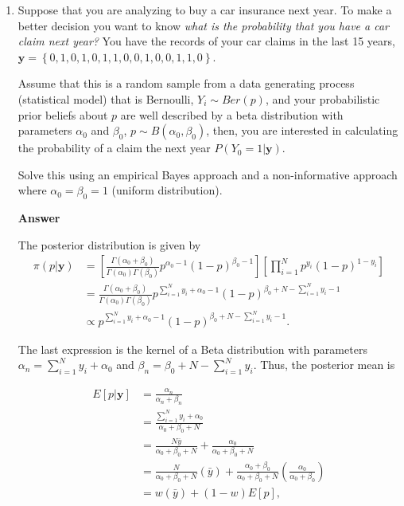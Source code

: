 \begin{enumerate}[leftmargin=*]
\item Suppose that you are analyzing to buy a car insurance next year. To make a better decision you want to know \textit{what is the probability that you have a car claim next year?} You have the records of your car claims in the last 15 years, $\mathbf{y}=\left\{0, 1, 0, 1, 0, 1, 1, 0, 0, 1, 0, 0, 1, 1, 0\right\}$.
	
Assume that this is a random sample from a data generating process (statistical model) that is Bernoulli, $Y_i\sim Ber(p)$, and your probabilistic prior beliefs about $p$ are well described by a beta distribution with parameters $\alpha_0$ and $\beta_0$, $p\sim B(\alpha_0, \beta_0)$, then, you are interested in calculating the probability of a claim the next year $P(Y_0 = 1|\mathbf{y})$.
	
Solve this using an empirical Bayes approach and a non-informative approach where $\alpha_0=\beta_0=1$ (uniform distribution).

\textbf{Answer}

The posterior distribution is given by
	\begin{align}
		\pi\left( p | \textbf{y}\right) & = \left[ \frac{\Gamma\left( \alpha_0 + \beta_0\right) }{\Gamma\left( \alpha_0\right) \Gamma\left( \beta_0\right) } p^{\alpha_0 - 1} \left( 1 - p \right)^{\beta_0 - 1} \right] \left[ \prod_{i = 1}^{N} p^{y_i} \left( 1 - p\right)^{1 - y_i} \right]  \\
		& = \frac{\Gamma\left( \alpha_0 + \beta_0\right) }{\Gamma\left( \alpha_0\right) \Gamma\left( \beta_0\right) } p^{\sum_{i = 1}^{N} y_i + \alpha_0 - 1} \left( 1 - p\right)^{\beta_0 + N - \sum_{i = 1}^{N} y_i - 1} \nonumber \\
		& \propto  p^{\sum_{i = 1}^{N} y_i + \alpha_0 - 1} \left( 1 - p\right)^{\beta_0 + N - \sum_{i = 1}^{N} y_i - 1}. \nonumber
	\end{align}
	
	The last expression is the kernel of a Beta distribution with parameters $\alpha_n = \sum_{i = 1}^{N} y_i + \alpha_0$ and $\beta_n = \beta_0 + N - \sum_{i = 1}^{N} y_i$. Thus, the posterior mean is 
	
	\begin{align}
		E\left[ p | \textbf{y}\right] & = \frac{\alpha_n}{\alpha_n + \beta_n} \nonumber \\
		& = \frac{\sum_{i = 1}^{N} y_i + \alpha_0}{\alpha_0 + \beta_0 + N} \\
		& = \frac{N \bar{y}}{\alpha_0 + \beta_0 + N} + \frac{\alpha_0}{\alpha_0 + \beta_0 + N} \nonumber \\
		& = \frac{N}{\alpha_0 + \beta_0 + N} \left( \bar{y} \right) + \frac{\alpha_0 + \beta_0}{\alpha_0 + \beta_0 + N} \left( \frac{\alpha_0}{\alpha_0 + \beta_0}\right) \nonumber \\
		& = w \left( \bar{y}\right) + (1 - w) E\left[ p \right], \nonumber  
	\end{align}
	

\end{enumerate}
